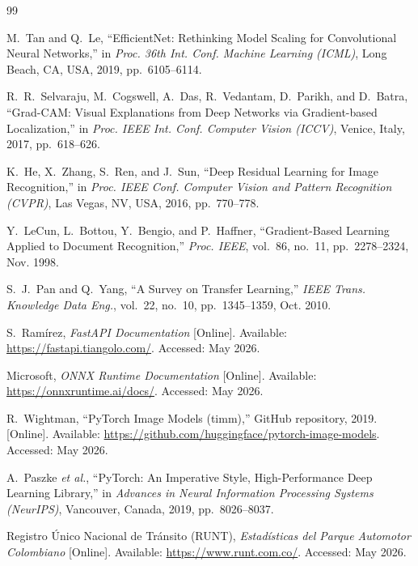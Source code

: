 \documentclass[12pt,a4paper]{article}
\begin{document}
\newpage
\begin{thebibliography}{99}

M.~Tan and Q.~Le,
``EfficientNet: Rethinking Model Scaling for Convolutional Neural Networks,''
in \textit{Proc. 36th Int. Conf. Machine Learning (ICML)},
Long Beach, CA, USA, 2019, pp.~6105--6114.

R.~R.~Selvaraju, M.~Cogswell, A.~Das, R.~Vedantam, D.~Parikh, and D.~Batra,
``Grad-CAM: Visual Explanations from Deep Networks via Gradient-based Localization,''
in \textit{Proc. IEEE Int. Conf. Computer Vision (ICCV)},
Venice, Italy, 2017, pp.~618--626.

K.~He, X.~Zhang, S.~Ren, and J.~Sun,
``Deep Residual Learning for Image Recognition,''
in \textit{Proc. IEEE Conf. Computer Vision and Pattern Recognition (CVPR)},
Las Vegas, NV, USA, 2016, pp.~770--778.

Y.~LeCun, L.~Bottou, Y.~Bengio, and P.~Haffner,
``Gradient-Based Learning Applied to Document Recognition,''
\textit{Proc. IEEE}, vol.~86, no.~11, pp.~2278--2324, Nov. 1998.

S.~J.~Pan and Q.~Yang,
``A Survey on Transfer Learning,''
\textit{IEEE Trans. Knowledge Data Eng.}, vol.~22, no.~10, pp.~1345--1359, Oct. 2010.

S.~Ramírez,
\textit{FastAPI Documentation} [Online].
Available: \url{https://fastapi.tiangolo.com/}.
Accessed: May 2026.

Microsoft,
\textit{ONNX Runtime Documentation} [Online].
Available: \url{https://onnxruntime.ai/docs/}.
Accessed: May 2026.

R.~Wightman,
``PyTorch Image Models (timm),''
GitHub repository, 2019.
[Online]. Available: \url{https://github.com/huggingface/pytorch-image-models}.
Accessed: May 2026.

A.~Paszke \textit{et al.},
``PyTorch: An Imperative Style, High-Performance Deep Learning Library,''
in \textit{Advances in Neural Information Processing Systems (NeurIPS)},
Vancouver, Canada, 2019, pp.~8026--8037.

Registro Único Nacional de Tránsito (RUNT),
\textit{Estadísticas del Parque Automotor Colombiano} [Online].
Available: \url{https://www.runt.com.co/}.
Accessed: May 2026.

\end{thebibliography}
\end{document}
